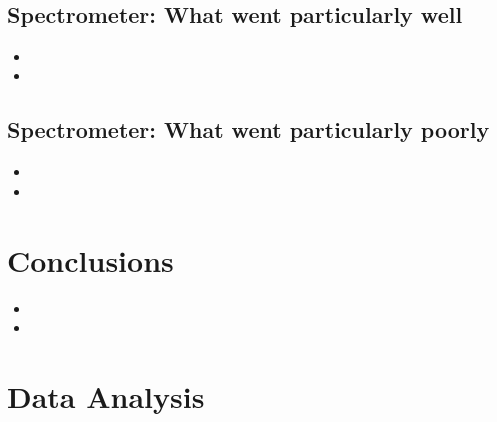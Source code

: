 \\


\subsection{Spectrometer: {\color{blue} What went particularly well}}

\begin{itemize}
\item{}
\item{}
\end{itemize}

\subsection{Spectrometer: {\color{red} What went particularly poorly}}

\begin{itemize}
\item{}
\item{}
\end{itemize}


\section{Conclusions}

\begin{itemize}
\item{}
\item{}
\end{itemize}


\newpage

\section{Data Analysis}

